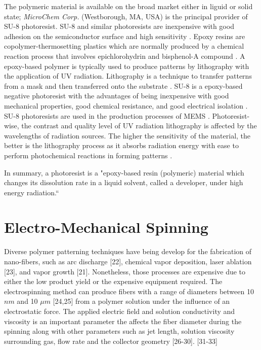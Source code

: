 The polymeric material is available on the broad market either in liguid or solid state; \emph{MicroChem Corp.} (Westborough, MA, USA) is the principal provider of SU-8 photoresist. SU-8 and similar photoresists are inexpensive with good adhesion on the semiconductor surface and high sensitivity \cite{Staab2011}. Epoxy resins are copolymer-thermosetting plastics which are normally produced by a chemical reaction process that involves epichlorohydrin and bisphenol-A compound \cite{Singla2010}. A epoxy-based polymer is typically used to produce patterns by lithography with the application of UV radiation. Lithography is a technique to transfer patterns from a mask and then transferred onto the substrate \cite{Landis2011,Xu2014}. SU-8 is a epoxy-based negative photoresist with the advantages of being inexpensive with good mechanical properties, good chemical resistance, and good electrical isolation \cite{Xu2014}. SU-8 photoresists are used in the production processes of MEMS \cite{Zhang2001}. Photoresist-wise, the contrast and quality level of UV radiation lithography is affected by the wavelengths of radiation sources. The higher the sensitivity of the material, the better is the lithography process as it absorbs radiation energy with ease to perform photochemical reactions in forming patterns \cite{Zhang2001}.

In summary, a photoresist is a "epoxy-based resin (polymeric) material which changes its dissolution rate in a liquid solvent, called a developer, under high energy radiation.`` \cite{Landis2011}

\section{Electro-Mechanical Spinning}
Diverse polymer patterning techniques have being develop for the fabrication of nano-fibers, such as arc discharge [22], chemical vapor deposition, laser ablation [23], and vapor growth [21]. Nonetheless, those processes are expensive due to either the low product yield or the expensive equipment required. The electrospinning method can produce fibers with a range of diameters between 10 $n m$ and 10 $\mu m$ [24,25] from a polymer solution under the influence of an electrostatic force. The applied electric field and solution conductivity and viscosity is an important parameter the affects the fiber diameter during the spinning along with other parameters such as jet length, solution viscosity surrounding gas, flow rate and the collector geometry [26-30]. [31-33]

